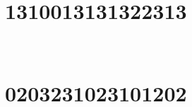 \section{1310013131322313}

\marginnote[3\baselineskip]{\centering}



\,
\newline
\vspace{1.2cm}

\section{0203231023101202}

\marginnote[3\baselineskip]{\centering}



\,
\newline
\vspace{1.2cm}
